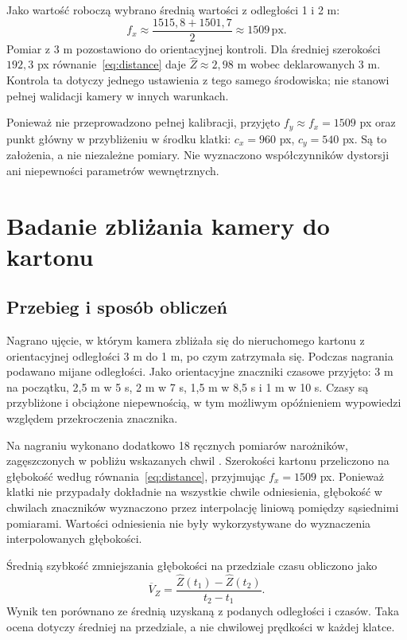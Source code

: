 \documentclass[12pt,a4paper]{article}
\begin{document}
Jako wartość roboczą wybrano średnią wartości z odległości 1 i 2 m:
\begin{equation}
f_x \approx \frac{1515{,}8+1501{,}7}{2} \approx 1509\,\mathrm{px}.
\end{equation}
Pomiar z 3 m pozostawiono do orientacyjnej kontroli. Dla średniej szerokości $192{,}3$ px równanie~\eqref{eq:distance} daje $\widehat Z\approx2{,}98$ m wobec deklarowanych 3 m. Kontrola ta dotyczy jednego ustawienia z tego samego środowiska; nie stanowi pełnej walidacji kamery w innych warunkach.

Ponieważ nie przeprowadzono pełnej kalibracji, przyjęto $f_y\approx f_x=1509$ px oraz punkt główny w przybliżeniu w środku klatki: $c_x=960$ px, $c_y=540$ px. Są to założenia, a nie niezależne pomiary. Nie wyznaczono współczynników dystorsji ani niepewności parametrów wewnętrznych.

\section{Badanie zbliżania kamery do kartonu}

\subsection{Przebieg i sposób obliczeń}

Nagrano ujęcie, w którym kamera zbliżała się do nieruchomego kartonu z orientacyjnej odległości 3 m do 1 m, po czym zatrzymała się. Podczas nagrania podawano mijane odległości. Jako orientacyjne znaczniki czasowe przyjęto: 3 m na początku, 2,5 m w 5 s, 2 m w 7 s, 1,5 m w 8,5 s i 1 m w 10 s. Czasy są przybliżone i obciążone niepewnością, w tym możliwym opóźnieniem wypowiedzi względem przekroczenia znacznika.

Na nagraniu wykonano dodatkowo 18 ręcznych pomiarów narożników, zagęszczonych w pobliżu wskazanych chwil \cite{pomiary}. Szerokości kartonu przeliczono na głębokość według równania~\eqref{eq:distance}, przyjmując $f_x=1509$ px. Ponieważ klatki nie przypadały dokładnie na wszystkie chwile odniesienia, głębokość w chwilach znaczników wyznaczono przez interpolację liniową pomiędzy sąsiednimi pomiarami. Wartości odniesienia nie były wykorzystywane do wyznaczenia interpolowanych głębokości.

Średnią szybkość zmniejszania głębokości na przedziale czasu obliczono jako
\begin{equation}
\overline{V}_Z = \frac{\widehat Z(t_1)-\widehat Z(t_2)}{t_2-t_1}.
\label{eq:speed}
\end{equation}
Wynik ten porównano ze średnią uzyskaną z podanych odległości i czasów. Taka ocena dotyczy średniej na przedziale, a nie chwilowej prędkości w każdej klatce.
\end{document}
